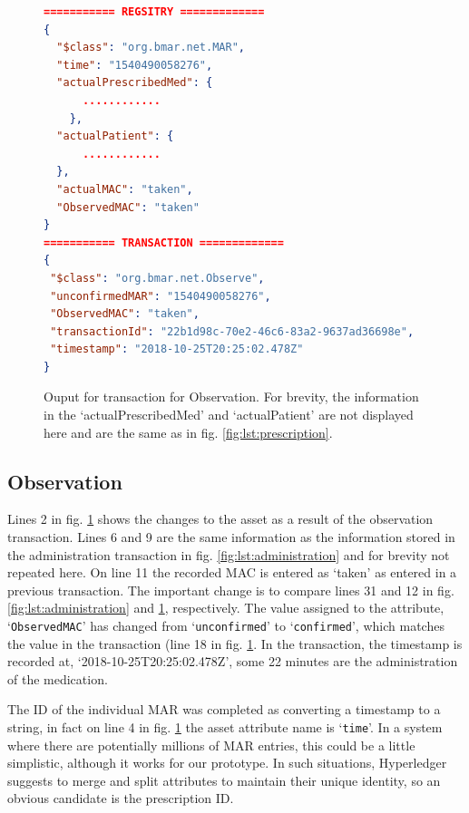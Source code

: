 \documentclass[runningheads]{llncs}
\begin{document}
\begin{figure}
	\tiny
	\begin{lstlisting}[language=json,firstnumber=1]
=========== REGSITRY ============= 
{
  "$class": "org.bmar.net.MAR",
  "time": "1540490058276",
  "actualPrescribedMed": {
	  ............
    },
  "actualPatient": {
	  ............
  },
  "actualMAC": "taken",
  "ObservedMAC": "taken"
}
=========== TRANSACTION =============
{
 "$class": "org.bmar.net.Observe",
 "unconfirmedMAR": "1540490058276",
 "ObservedMAC": "taken",
 "transactionId": "22b1d98c-70e2-46c6-83a2-9637ad36698e",
 "timestamp": "2018-10-25T20:25:02.478Z"
}
\end{lstlisting}
	\caption{Ouput for transaction for Observation. For brevity, the information in the `actualPrescribedMed' and `actualPatient' are not displayed here and are the same as in fig. \ref{fig:lst:prescription}.}
\label{fig:lst:observation}
\end{figure}

\subsection{Observation}
Lines 2 in fig. \ref{fig:lst:observation} shows the changes to the asset as a result of the observation transaction. Lines 6 and 9 are the same information as the information stored in the administration transaction in fig. \ref{fig:lst:administration} and for brevity not repeated here.  On line 11 the recorded MAC is entered as `taken' as entered in a previous transaction. The important change is to compare lines 31 and 12 in fig. \ref{fig:lst:administration} and \ref{fig:lst:observation}, respectively. The value assigned to the attribute, `{\tt ObservedMAC}' has changed from `{\tt unconfirmed}' to `{\tt confirmed}', which matches the value in the transaction (line 18 in fig. \ref{fig:lst:observation}. In the transaction, the timestamp is recorded at, `2018-10-25T20:25:02.478Z', some 22 minutes are the administration of the medication. 

The ID of the individual MAR was completed as converting a timestamp to a string, in fact on line 4 in fig. \ref{fig:lst:observation} the asset attribute name is `{\tt time}'. In a system where there are potentially millions of MAR entries, this could be a little simplistic, although it works for our prototype. In such situations, Hyperledger suggests to merge and split attributes to maintain their unique identity, so an obvious candidate is the prescription ID.
\end{document}
